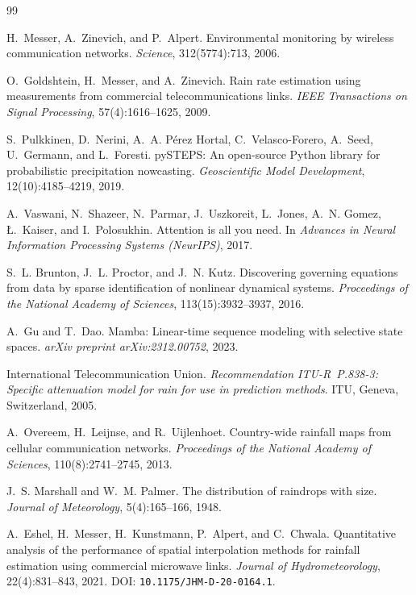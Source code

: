 \documentclass[12pt, a4paper]{article}
\begin{document}
\begin{thebibliography}{99}

H.~Messer, A.~Zinevich, and P.~Alpert.
\newblock Environmental monitoring by wireless communication networks.
\newblock \emph{Science}, 312(5774):713, 2006.

O.~Goldshtein, H.~Messer, and A.~Zinevich.
\newblock Rain rate estimation using measurements from commercial telecommunications links.
\newblock \emph{IEEE Transactions on Signal Processing}, 57(4):1616--1625, 2009.

S.~Pulkkinen, D.~Nerini, A.~A. P\'erez Hortal, C.~Velasco-Forero, A.~Seed, U.~Germann, and L.~Foresti.
\newblock pySTEPS: An open-source Python library for probabilistic precipitation nowcasting.
\newblock \emph{Geoscientific Model Development}, 12(10):4185--4219, 2019.

A.~Vaswani, N.~Shazeer, N.~Parmar, J.~Uszkoreit, L.~Jones, A.~N. Gomez, {\L}.~Kaiser, and I.~Polosukhin.
\newblock Attention is all you need.
\newblock In \emph{Advances in Neural Information Processing Systems (NeurIPS)}, 2017.

S.~L. Brunton, J.~L. Proctor, and J.~N. Kutz.
\newblock Discovering governing equations from data by sparse identification of nonlinear dynamical systems.
\newblock \emph{Proceedings of the National Academy of Sciences}, 113(15):3932--3937, 2016.

A.~Gu and T.~Dao.
\newblock Mamba: Linear-time sequence modeling with selective state spaces.
\newblock \emph{arXiv preprint arXiv:2312.00752}, 2023.

International Telecommunication Union.
\newblock \emph{Recommendation ITU-R~P.838-3: Specific attenuation model for rain for use in prediction methods}.
\newblock ITU, Geneva, Switzerland, 2005.

A.~Overeem, H.~Leijnse, and R.~Uijlenhoet.
\newblock Country-wide rainfall maps from cellular communication networks.
\newblock \emph{Proceedings of the National Academy of Sciences}, 110(8):2741--2745, 2013.

J.~S. Marshall and W.~M. Palmer.
\newblock The distribution of raindrops with size.
\newblock \emph{Journal of Meteorology}, 5(4):165--166, 1948.

A.~Eshel, H.~Messer, H.~Kunstmann, P.~Alpert, and C.~Chwala.
\newblock Quantitative analysis of the performance of spatial interpolation methods for rainfall estimation using commercial microwave links.
\newblock \emph{Journal of Hydrometeorology}, 22(4):831--843, 2021.
\newblock DOI: \texttt{10.1175/JHM-D-20-0164.1}.


\end{thebibliography}
\end{document}
